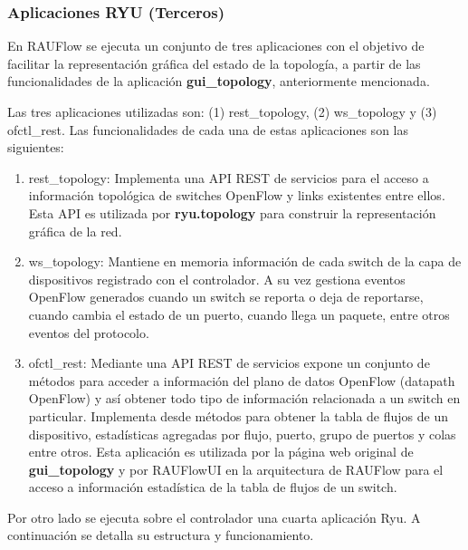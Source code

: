 \subsubsection{Aplicaciones RYU (Terceros)}
En RAUFlow se ejecuta un conjunto de tres aplicaciones con el objetivo de facilitar la representaci\'on gr\'afica del estado de la topolog\'ia, a partir de las funcionalidades de la aplicación \textbf{gui\_topology}, anteriormente mencionada. 

Las tres aplicaciones utilizadas son:
(1) rest\_topology, (2) ws\_topology y (3) ofctl\_rest. Las funcionalidades de cada una de estas aplicaciones son las siguientes:

\begin{enumerate}
\item rest\_topology: Implementa una API REST de servicios para el acceso a informaci\'on topol\'ogica de switches OpenFlow y links existentes entre ellos. Esta API es utilizada por \textbf{ryu.topology} para construir la representaci\'on gr\'afica de la red.

\item ws\_topology: Mantiene en memoria informaci\'on de cada switch de la capa de dispositivos registrado con el controlador. A su vez gestiona eventos OpenFlow generados cuando un switch se reporta o deja de reportarse, cuando cambia el estado de un puerto, cuando llega un paquete, entre otros eventos del protocolo.

\item ofctl\_rest: Mediante una API REST de servicios expone un conjunto de m\'etodos para acceder a informaci\'on del plano de datos OpenFlow (datapath OpenFlow) y as\'i obtener todo tipo de informaci\'on relacionada a un switch en particular. Implementa desde m\'etodos para obtener la tabla de flujos de un dispositivo, estadísticas agregadas por flujo, puerto, grupo de puertos y colas entre otros. Esta aplicaci\'on es utilizada por la p\'agina web original de \textbf{gui\_topology} y por RAUFlowUI en la arquitectura de RAUFlow para el acceso a informaci\'on estad\'istica de la tabla de flujos de un switch.

\end{enumerate}

Por otro lado se ejecuta sobre el controlador una cuarta aplicaci\'on Ryu. A continuaci\'on se detalla su estructura y funcionamiento.

